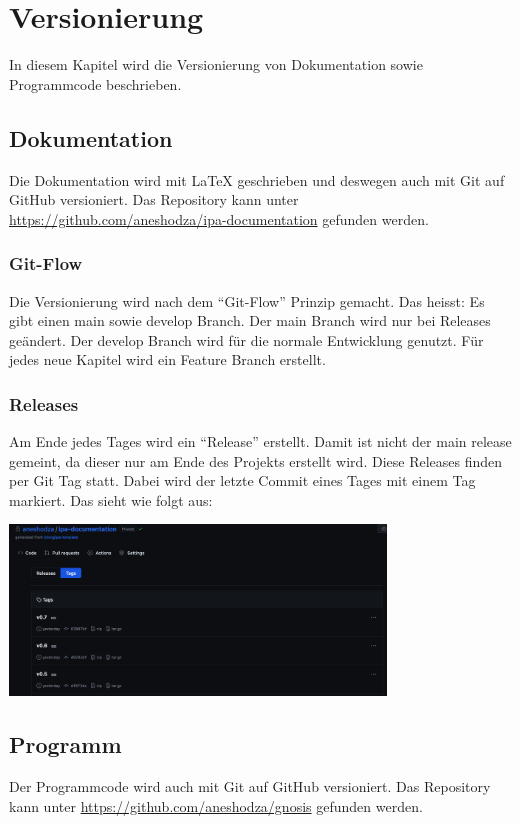 \section{Versionierung}
In diesem Kapitel wird die Versionierung von Dokumentation sowie Programmcode beschrieben.
\subsection{Dokumentation}
Die Dokumentation wird mit LaTeX geschrieben und deswegen auch mit Git auf GitHub versioniert. Das
Repository kann unter \url{https://github.com/aneshodza/ipa-documentation} gefunden werden.
\subsubsection{Git-Flow}
Die Versionierung wird nach dem \enquote{Git-Flow} Prinzip gemacht. Das heisst: Es gibt einen main sowie
develop Branch. Der main Branch wird nur bei Releases geändert. Der develop Branch wird für die normale
Entwicklung genutzt. Für jedes neue Kapitel wird ein Feature Branch erstellt.
\subsubsection{Releases}
Am Ende jedes Tages wird ein \enquote{Release} erstellt. Damit ist nicht der main release gemeint, da dieser
nur am Ende des Projekts erstellt wird. Diese Releases finden per Git Tag statt. Dabei wird der letzte
Commit eines Tages mit einem Tag markiert. Das sieht wie folgt aus:
\begin{center}
    \includegraphics[width=0.75\textwidth]{images/misc/git_tag.png}
    \label{fig:git_tag}
\end{center}

\subsection{Programm}
Der Programmcode wird auch mit Git auf GitHub versioniert. Das Repository kann unter
\url{https://github.com/aneshodza/gnosis} gefunden werden.
